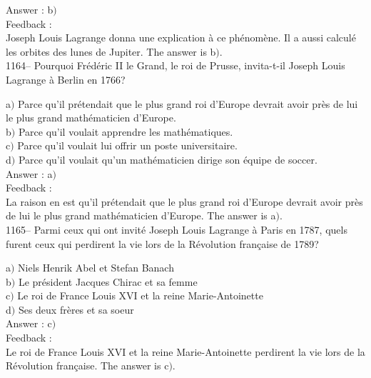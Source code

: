 ﻿\documentclass[letterpaper, 12pt]{article}
\begin{document}
Answer : b$)$\\

Feedback : \\
Joseph Louis Lagrange donna une explication \`a ce ph\'enom\`ene. Il
a aussi calcul\'e les orbites des lunes de Jupiter.
The answer is b$)$.\\













1164-- Pourquoi Fr\'ed\'eric II le Grand, le roi de Prusse,
invita-t-il Joseph Louis Lagrange \`a Berlin en 1766?

a$)$ Parce qu'il pr\'etendait que \og le plus grand roi d'Europe
devrait avoir pr\`es de lui le plus grand math\'ematicien d'Europe\fg . \\
b$)$ Parce qu'il voulait apprendre les math\'ematiques. \\
c$)$ Parce qu'il voulait lui offrir un poste universitaire. \\
d$)$ Parce qu'il voulait qu'un math\'ematicien dirige son \'equipe de
soccer. \\

Answer : a$)$\\

Feedback : \\
La raison en est qu'il pr\'etendait que \og le plus grand roi
d'Europe devrait avoir pr\`es de lui le plus grand math\'ematicien
d'Europe\fg .
The answer is a$)$.\\

1165-- Parmi ceux qui ont invit\'e Joseph Louis Lagrange \`a Paris
en 1787, quels furent ceux qui perdirent la vie lors de la
R\'evolution fran\c caise de 1789?

a$)$ Niels Henrik Abel et Stefan Banach \\
b$)$ Le pr\'esident Jacques Chirac et sa femme \\
c$)$ Le roi de France Louis XVI et la reine Marie-Antoinette \\
d$)$ Ses deux fr\`eres et sa soeur \\

Answer : c$)$\\

Feedback : \\
Le roi de France Louis XVI et la reine Marie-Antoinette perdirent la vie
lors de la R\'evolution fran\c caise.
The answer is c$)$.\\
\end{document}
